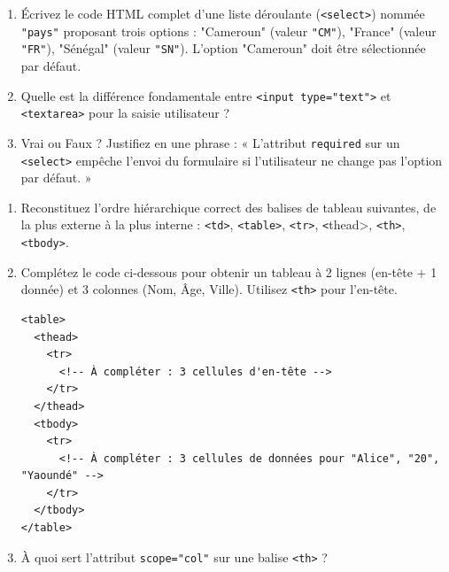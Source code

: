 \documentclass[11pt]{article}
\begin{document}
\begin{exercice}
\begin{enumerate}
    \item Écrivez le code HTML complet d'une liste déroulante (\texttt{<select>}) nommée \texttt{"pays"} proposant trois options : "Cameroun" (valeur \texttt{"CM"}), "France" (valeur \texttt{"FR"}), "Sénégal" (valeur \texttt{"SN"}). L'option "Cameroun" doit être sélectionnée par défaut.
    \item Quelle est la différence fondamentale entre \texttt{<input type="text">} et \texttt{<textarea>} pour la saisie utilisateur ?
    \item Vrai ou Faux ? Justifiez en une phrase : « L'attribut \texttt{required} sur un \texttt{<select>} empêche l'envoi du formulaire si l'utilisateur ne change pas l'option par défaut. »
\end{enumerate}
\end{exercice}

\begin{exercice}
\begin{enumerate}
    \item Reconstituez l'ordre hiérarchique correct des balises de tableau suivantes, de la plus externe à la plus interne : \texttt{<td>}, \texttt{<table>}, \texttt{<tr>}, \texttt<thead>, \texttt{<th>}, \texttt{<tbody>}.
    \item Complétez le code ci-dessous pour obtenir un tableau à 2 lignes (en-tête + 1 donnée) et 3 colonnes (Nom, Âge, Ville). Utilisez \texttt{<th>} pour l'en-tête.
\begin{verbatim}
<table>
  <thead>
    <tr>
      <!-- À compléter : 3 cellules d'en-tête -->
    </tr>
  </thead>
  <tbody>
    <tr>
      <!-- À compléter : 3 cellules de données pour "Alice", "20", "Yaoundé" -->
    </tr>
  </tbody>
</table>
\end{verbatim}
    \item À quoi sert l'attribut \texttt{scope="col"} sur une balise \texttt{<th>} ?
\end{enumerate}
\end{exercice}
\end{document}
